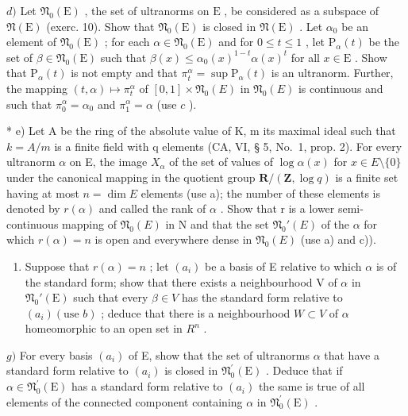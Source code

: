 \(d)\) Let \(\mathfrak{N}_0(\mathrm{E})\) , the set of ultranorms on \(\mathrm{E}\) , be considered as a subspace of \(\mathfrak{N}(\mathrm{E})\) (exerc. 10). Show that \(\mathfrak{N}_0(\mathrm{E})\) is closed in \(\mathfrak{N}(\mathrm{E})\) . Let \(\alpha_0\) be an element of \(\mathfrak{N}_0(\mathrm{E})\) ; for each \(\alpha \in \mathfrak{N}_0(\mathrm{E})\) and for \(0 \leqslant t \leqslant 1\) , let \(\mathrm{P}_{\alpha}(t)\) be the set of \(\beta \in \mathfrak{N}_0(\mathrm{E})\) such that \(\beta(x) \leqslant \alpha_0(x)^{1 - t}\alpha(x)^t\) for all \(x \in \mathrm{E}\) . Show that \(\mathrm{P}_{\alpha}(t)\) is not empty and that \(\pi_t^\alpha = \sup \mathrm{P}_{\alpha}(t)\) is an ultranorm. Further, the mapping \((t, \alpha) \mapsto \pi_t^\alpha\) of \([0, 1] \times \mathfrak{N}_0(E)\) in \(\mathfrak{N}_0(E)\) is continuous and such that \(\pi_0^\alpha = \alpha_0\) and \(\pi_1^\alpha = \alpha\) (use \(c\) ).

* e) Let A be the ring of the absolute value of K, m its maximal ideal such that \(k = A/m\) is a finite field with q elements (CA, VI, § 5, No.~1, prop. 2). For every ultranorm \(\alpha\) on E, the image \(X_{\alpha}\) of the set of values of \(\log \alpha(x)\) for \(x \in E \setminus \{0\}\) under the canonical mapping in the quotient group \(\mathbf{R}/(\mathbf{Z}, \log q)\) is a finite set having at most \(n = \dim E\) elements (use a); the number of these elements is denoted by \(r(\alpha)\) and called the rank of \(\alpha\) . Show that r is a lower semi-continuous mapping of \(\mathfrak{N}_{0}(E)\) in N and that the set \(\mathfrak{N}_{0}'(E)\) of the \(\alpha\) for which \(r(\alpha) = n\) is open and everywhere dense in \(\mathfrak{N}_{0}(E)\) (use a) and c)).

\begin{enumerate}
\def\labelenumi{\alph{enumi})}
\setcounter{enumi}{5}
\tightlist
\item
  Suppose that \(r(\alpha) = n\) ; let \((a_i)\) be a basis of E relative to which \(\alpha\) is of the standard form; show that there exists a neighbourhood V of \(\alpha\) in \(\mathfrak{N}_0'(\mathrm{E})\) such that every \(\beta \in V\) has the standard form relative to \((a_i)(\text{use } b)\) ; deduce that there is a neighbourhood \(W \subset V\) of \(\alpha\) homeomorphic to an open set in \(R^n\) .
\end{enumerate}

\(g)\) For every basis \((a_i)\) of E, show that the set of ultranorms \(\alpha\) that have a standard form relative to \((a_i)\) is closed in \(\mathfrak{N}_0^{\prime}(\mathrm{E})\) . Deduce that if \(\alpha \in \mathfrak{N}_0^{\prime}(\mathrm{E})\) has a standard form relative to \((a_i)\) the same is true of all elements of the connected component containing \(\alpha\) in \(\mathfrak{N}_0^{\prime}(\mathrm{E})\) .

